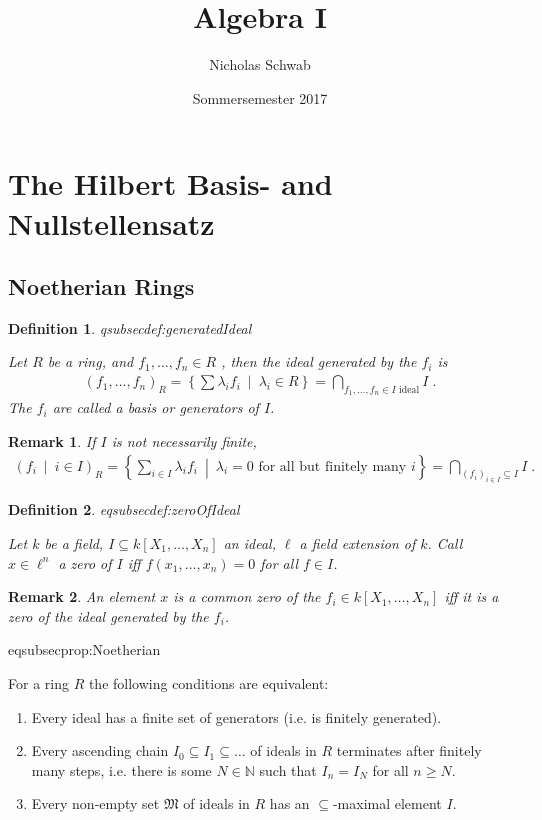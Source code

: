 \documentclass[DIV=14,parskip=full,pointednumbers]{scrartcl}
\title{Algebra I}
\author{Nicholas Schwab}
\date{Sommersemester 2017}
\newenvironment{rmnumerate}{\begin{enumerate}[label={\upshape(\roman*)},ref=\curthm]}{\end{enumerate}}
\theoremstyle{cthm}
\theoremstyle{cvarthm}
\theoremstyle{cdef}
\newtheorem{defi}{Definition}[subsection]
\newtheorem{rem}{Remark}[subsection]
\newcommand{\lbl}[1]{
	\label{#1}
	\ifmmode
	\expandafter\xdef\csname eqsubsec#1\endcsname{\thesubsection}
	\fi
}
\newcommand{\IN}{\mathbb{N}}
\newcommand{\st}{\ \middle|\ }
\begin{document}
	
	\maketitle
	\tableofcontents
	\section{The Hilbert Basis- and Nullstellensatz}
	\subsection{Noetherian Rings}
	\begin{defi}\lbl{def:generatedIdeal}
		Let $R$ be a ring, and $f_1,\ldots, f_n\in R$ , then  the \emph{ideal generated by the $f_i$} is
		\begin{align*}\left( f_1,\ldots,  f_n\right)_R = \left\{\sum\lambda_i f_i\st\lambda_i \in R\right\} = \bigcap_{f_1,\ldots,f_n\in I\text{ ideal}} I\;.
		\end{align*}
		The $f_i$ are called a \emph{basis} or \emph{generators} of $I$. 
	\end{defi}
	\begin{rem}
		If $I$ is not necessarily finite, 
		\begin{align*}
		\left( f_i\st i\in I\right)_R = \left\{\sum_{i\in I} \lambda_i f_i \st\lambda_i = 0 \text{ for all but finitely many } i\right\} = \bigcap_{(f_i)_{i\in I}\subseteq I} I\;.
		\end{align*}
	\end{rem}
	\begin{defi}\lbl{def:zeroOfIdeal}
		Let $k$ be a field, $I\subseteq k[X_1,\ldots, X_n]$ an ideal, $\ell$ a field extension of $k$. Call $x\in \ell^n$ a \emph{zero} of $I$ iff $f(x_1,\ldots,x_n) = 0$ for all $f\in I$. 
	\end{defi}
	\begin{rem}
		An element $x$ is a common zero of the $f_i\in k[X_1,\ldots,X_n]$ iff it is a zero of the ideal generated by the $f_i$.
	\end{rem}
	\begin{prop}\lbl{prop:Noetherian}
		For a ring $R$ the following conditions are equivalent:
		\begin{rmnumerate}
			\item Every ideal has a finite set of generators (i.e. is finitely generated).
			\item Every ascending chain $I_0 \subseteq I_1 \subseteq \ldots$ of ideals in $R$ terminates after finitely many steps, i.e. there is some $N\in\IN$ such that $I_n=I_N$ for all $n\geq N$.
			\item Every non-empty set $\mathfrak{M}$ of ideals in $R$ has an $\subseteq$-maximal element $I$. 
		\end{rmnumerate}
	\end{prop}
	
\end{document}
